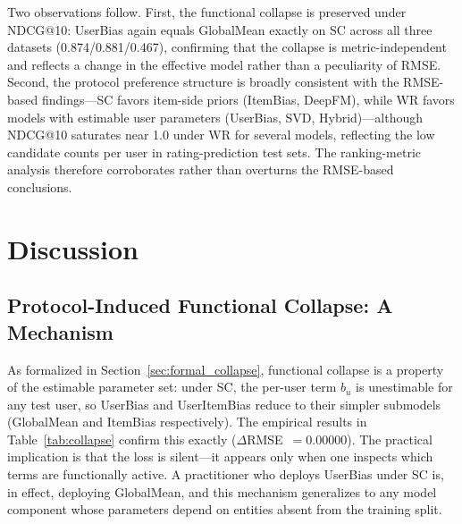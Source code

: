 \documentclass[journal]{IEEEtran}
\begin{document}
Two observations follow. First, the functional collapse is preserved under NDCG@10: UserBias again equals GlobalMean exactly on SC across all three datasets (0.874/0.881/0.467), confirming that the collapse is metric-independent and reflects a change in the effective model rather than a peculiarity of RMSE. Second, the protocol preference structure is broadly consistent with the RMSE-based findings---SC favors item-side priors (ItemBias, DeepFM), while WR favors models with estimable user parameters (UserBias, SVD, Hybrid)---although NDCG@10 saturates near 1.0 under WR for several models, reflecting the low candidate counts per user in rating-prediction test sets. The ranking-metric analysis therefore corroborates rather than overturns the RMSE-based conclusions.

\FloatBarrier

\section{Discussion}
\label{sec:discussion}

\subsection{Protocol-Induced Functional Collapse: A Mechanism}
As formalized in Section~\ref{sec:formal_collapse}, functional collapse is a property of the estimable parameter set: under SC, the per-user term $b_u$ is unestimable for any test user, so UserBias and UserItemBias reduce to their simpler submodels (GlobalMean and ItemBias respectively). The empirical results in Table~\ref{tab:collapse} confirm this exactly ($\Delta$RMSE~$=0.00000$). The practical implication is that the loss is silent---it appears only when one inspects which terms are functionally active. A practitioner who deploys UserBias under SC is, in effect, deploying GlobalMean, and this mechanism generalizes to any model component whose parameters depend on entities absent from the training split.
\end{document}
